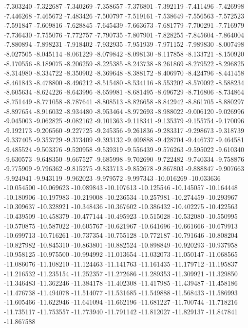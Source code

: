 -7.303240
-7.322687
-7.340269
-7.358657
-7.376801
-7.392119
-7.411496
-7.426998
-7.446268
-7.465672
-7.483426
-7.500797
-7.519161
-7.538649
-7.556563
-7.572523
-7.591847
-7.609816
-7.628845
-7.645439
-7.663673
-7.681779
-7.700291
-7.716979
-7.736430
-7.755076
-7.772757
-7.790735
-7.807901
-7.828255
-7.845604
-7.864004
-7.880894
-7.898231
-7.918402
-7.932935
-7.951939
-7.971152
-7.989830
-8.007498
-8.027505
-8.045114
-8.061229
-8.079842
-8.098130
-8.117858
-8.133721
-8.150920
-8.170556
-8.189075
-8.206259
-8.225385
-8.243738
-8.261869
-8.279522
-8.296825
-8.314980
-8.334722
-8.350902
-8.369648
-8.388172
-8.406970
-8.424796
-8.441458
-8.461843
-8.478800
-8.496212
-8.515480
-8.534116
-8.553202
-8.570092
-8.588234
-8.605634
-8.624226
-8.643996
-8.659981
-8.681495
-8.696729
-8.716806
-8.734864
-8.751449
-8.771058
-8.787641
-8.808513
-8.826658
-8.842942
-8.861705
-8.880297
-8.897654
-8.916032
-8.934480
-8.953464
-8.972693
-8.988022
-9.006120
-9.026996
-9.045003
-9.062825
-9.082162
-9.101363
-9.118341
-9.135379
-9.155754
-9.170096
-9.192173
-9.206560
-9.227725
-9.245356
-9.261836
-9.283317
-9.298673
-9.318739
-9.337405
-9.353729
-9.373409
-9.393132
-9.409888
-9.428704
-9.446737
-9.464581
-9.485524
-9.503376
-9.520958
-9.539319
-9.556439
-9.576263
-9.595022
-9.610340
-9.630573
-9.648350
-9.667527
-9.685998
-9.702690
-9.722482
-9.740334
-9.758876
-9.775909
-9.796362
-9.815275
-9.833713
-9.852678
-9.867803
-9.888847
-9.907663
-9.924941
-9.943119
-9.962023
-9.979572
-9.997343
-10.016269
-10.033636
-10.054500
-10.069623
-10.089843
-10.107613
-10.125546
-10.145057
-10.164448
-10.180906
-10.197983
-10.219008
-10.236534
-10.257981
-10.274459
-10.293967
-10.309637
-10.328921
-10.348436
-10.367602
-10.386432
-10.402275
-10.422563
-10.439509
-10.458379
-10.477144
-10.495923
-10.515028
-10.532080
-10.550995
-10.570875
-10.587022
-10.605767
-10.621967
-10.641696
-10.661666
-10.679913
-10.699713
-10.716261
-10.737354
-10.755128
-10.772187
-10.791646
-10.808204
-10.827982
-10.845310
-10.863801
-10.882524
-10.898849
-10.920293
-10.937958
-10.958125
-10.975500
-10.994992
-11.013654
-11.032073
-11.050147
-11.068565
-11.086076
-11.108210
-11.124463
-11.141763
-11.161435
-11.179712
-11.195837
-11.216532
-11.235154
-11.252357
-11.272686
-11.289353
-11.309921
-11.329850
-11.346483
-11.362246
-11.384178
-11.402308
-11.417985
-11.439487
-11.458186
-11.476738
-11.494078
-11.514077
-11.531685
-11.549888
-11.568433
-11.586993
-11.605466
-11.622946
-11.641094
-11.662196
-11.681227
-11.700744
-11.718216
-11.735117
-11.753557
-11.773940
-11.791142
-11.812027
-11.829137
-11.847841
-11.867588
